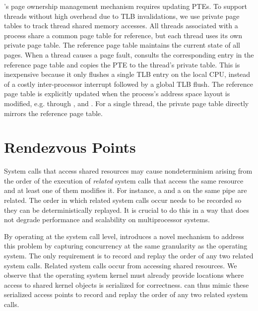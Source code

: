   

\scribe{}'s page ownership management mechanism requires updating
PTEs.  To support threads without high
overhead due to TLB invalidations, we use private page tables to
track thread shared memory accesses.  All threads associated with
a process share a common
page table for reference, but each thread uses its own private
page table.  The reference page table maintains the current
state of all pages.  When a thread causes a page fault, \scribe{}
consults the corresponding entry in the reference page table and
copies the PTE to the thread's private table. This is inexpensive
because it only flushes a single TLB entry on the local CPU, instead
of a costly inter-processor interrupt followed by a global TLB flush.
The reference page table
is explicitly updated when the process's
address space layout is modified, e.g. through ,  and
. For a
single thread, the private page table directly mirrors the reference
page table. 

 

	

 

  
\section{Rendezvous Points}
\label{scribe:sec:rendezvous}

System calls that access shared resources may cause nondeterminism
arising from the order of the execution of {\em related} system calls
that access the same resource and at least one of them modifies it.
For instance, a  and a  on the same pipe are
related. The order in which related system calls occur needs to be
recorded so they can be deterministically replayed.  It is crucial
to do this in a way that does not degrade performance and scalability
on multiprocessor systems.

By operating at the system call level, \scribe{} introduces a novel
mechanism to address this problem by capturing concurrency at the same
granularity as the operating system.  The only requirement is
to record and replay the order of any two related system calls.
Related system calls occur from accessing shared resources.  We
observe that the operating system kernel must already provide
locations where access to shared kernel objects is serialized for
correctness.  \scribe{} can thus mimic these serialized access
points to record and replay the order of any two related system calls.

